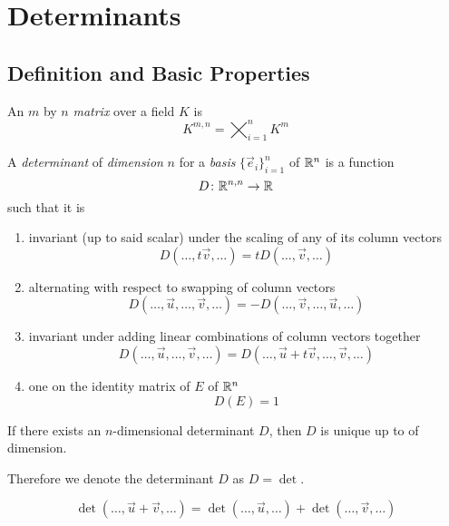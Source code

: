 \documentclass[notes]{subfiles}
\begin{document}
\setcounter{section}{4}
\section{Determinants}
\subsection{Definition and Basic Properties}
\begin{definition}[Matrix]
    An $m$ by $n$ \textit{matrix} over a field $K$ is
    \[
        K^{m, n} = \bigtimes_{i = 1}^n K^m
    \]
\end{definition}

\begin{definition}[Determinant]
    A \textit{determinant} of \textit{dimension} $n$ for a \textit{basis} $\{ \vec{e}_i \}_{i = 1}^n$ of $\mathbb{R}^n$ is a function
    \[
        D\colon \mathbb{R}^{n, n} \to \mathbb{R}
    \]
    such that it is
    \begin{enumerate}[label = (\arabic*)]
        \item invariant (up to said scalar) under the scaling of any of its column vectors
        \[
            D(\ldots, t\vec{v}, \ldots) = tD(\ldots, \vec{v}, \ldots)
        \]
        \item alternating with respect to swapping of column vectors
        \[
            D(\ldots, \vec{u}, \ldots, \vec{v}, \ldots) = -D(\ldots, \vec{v}, \ldots, \vec{u}, \ldots)
        \]
        \item invariant under adding linear combinations of column vectors together
        \[
            D(\ldots, \vec{u}, \ldots, \vec{v}, \ldots) = D(\ldots, \vec{u} + t\vec{v}, \ldots, \vec{v}, \ldots)
        \]
        \item one on the identity matrix of $E$ of $\mathbb{R}^n$
        \[
            D(E) = 1
        \]
    \end{enumerate}
\end{definition}

\begin{lemma}
    If there exists an $n$-dimensional determinant $D$, then $D$ is unique up to of dimension.
\end{lemma}

Therefore we denote the determinant $D$ as $D = \det$.

\begin{theorem} \label{det_additive}
    \[
        \det(\ldots, \vec{u} + \vec{v}, \ldots) = \det(\ldots, \vec{u}, \ldots) + \det(\ldots, \vec{v}, \ldots)
    \]
\end{theorem}
\end{document}
